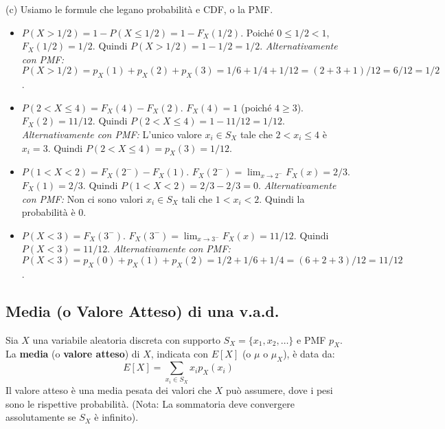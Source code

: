 \begin{example}
(c) Usiamo le formule che legano probabilità e CDF, o la PMF.
    \begin{itemize}
        \item $P(X > 1/2) = 1 - P(X \le 1/2) = 1 - F_X(1/2)$. Poiché $0 \le 1/2 < 1$, $F_X(1/2) = 1/2$.
        Quindi $P(X > 1/2) = 1 - 1/2 = 1/2$.
        \textit{Alternativamente con PMF:} $P(X > 1/2) = p_X(1) + p_X(2) + p_X(3) = 1/6 + 1/4 + 1/12 = (2+3+1)/12 = 6/12 = 1/2$.
        
        \item $P(2 < X \le 4) = F_X(4) - F_X(2)$.
        $F_X(4) = 1$ (poiché $4 \ge 3$). $F_X(2) = 11/12$.
        Quindi $P(2 < X \le 4) = 1 - 11/12 = 1/12$.
        \textit{Alternativamente con PMF:} L'unico valore $x_i \in S_X$ tale che $2 < x_i \le 4$ è $x_i=3$.
        Quindi $P(2 < X \le 4) = p_X(3) = 1/12$.

        \item $P(1 < X < 2) = F_X(2^-) - F_X(1)$.
        $F_X(2^-) = \lim_{x \to 2^-} F_X(x) = 2/3$. $F_X(1) = 2/3$.
        Quindi $P(1 < X < 2) = 2/3 - 2/3 = 0$.
        \textit{Alternativamente con PMF:} Non ci sono valori $x_i \in S_X$ tali che $1 < x_i < 2$. Quindi la probabilità è 0.
        
        \item $P(X < 3) = F_X(3^-)$.
        $F_X(3^-) = \lim_{x \to 3^-} F_X(x) = 11/12$.
        Quindi $P(X < 3) = 11/12$.
        \textit{Alternativamente con PMF:} $P(X < 3) = p_X(0) + p_X(1) + p_X(2) = 1/2 + 1/6 + 1/4 = (6+2+3)/12 = 11/12$.
    \end{itemize}
\end{example}

\subsection{Media (o Valore Atteso) di una v.a.d.}
\begin{definition}
Sia $X$ una variabile aleatoria discreta con supporto $S_X = \{x_1, x_2, \dots\}$ e PMF $p_X$. La \textbf{media} (o \textbf{valore atteso}) di $X$, indicata con $E[X]$ (o $\mu$ o $\mu_X$), è data da:
\[ E[X] = \sum_{x_i \in S_X} x_i p_X(x_i) \]
Il valore atteso è una media pesata dei valori che $X$ può assumere, dove i pesi sono le rispettive probabilità.
(Nota: La sommatoria deve convergere assolutamente se $S_X$ è infinito).
\end{definition}

